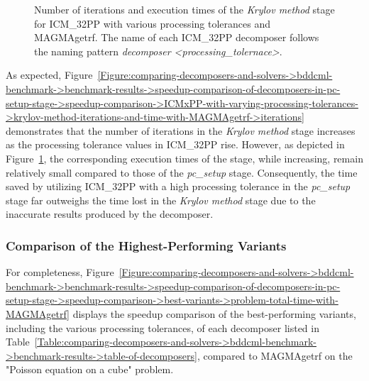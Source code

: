 \begin{figure}[ht!]
\begin{subfigure}{\textwidth}
		\label{Figure:comparing-decomposers-and-solvers->bddcml-benchmark->benchmark-results->speedup-comparison-of-decomposers-in-pc-setup-stage->speedup-comparison->ICMxPP-with-varying-processing-tolerances->krylov-method-iterations-and-time-with-MAGMAgetrf->time}
	\end{subfigure}
	\caption{Number of iterations and execution times of the \textit{Krylov method} stage for ICM\_32PP with various processing tolerances and MAGMAgetrf.
		The name of each ICM\_32PP decomposer follows the naming pattern \textit{decomposer <processing\_tolernace>}.
	}
	\label{Figure:comparing-decomposers-and-solvers->bddcml-benchmark->benchmark-results->speedup-comparison-of-decomposers-in-pc-setup-stage->speedup-comparison->ICMxPP-with-varying-processing-tolerances->krylov-method-iterations-and-time-with-MAGMAgetrf}
\end{figure}

As expected, Figure~\ref{Figure:comparing-decomposers-and-solvers->bddcml-benchmark->benchmark-results->speedup-comparison-of-decomposers-in-pc-setup-stage->speedup-comparison->ICMxPP-with-varying-processing-tolerances->krylov-method-iterations-and-time-with-MAGMAgetrf->iterations} demonstrates that the number of iterations in the \textit{Krylov method} stage increases as the processing tolerance values in ICM\_32PP rise.
However, as depicted in Figure~\ref{Figure:comparing-decomposers-and-solvers->bddcml-benchmark->benchmark-results->speedup-comparison-of-decomposers-in-pc-setup-stage->speedup-comparison->ICMxPP-with-varying-processing-tolerances->krylov-method-iterations-and-time-with-MAGMAgetrf->time}, the corresponding execution times of the stage, while increasing, remain relatively small compared to those of the \textit{pc\_setup} stage.
Consequently, the time saved by utilizing ICM\_32PP with a high processing tolerance in the \textit{pc\_setup} stage far outweighs the time lost in the \textit{Krylov method} stage due to the inaccurate results produced by the decomposer.

\subsubsection{Comparison of the Highest-Performing Variants} For completeness, Figure~\ref{Figure:comparing-decomposers-and-solvers->bddcml-benchmark->benchmark-results->speedup-comparison-of-decomposers-in-pc-setup-stage->speedup-comparison->best-variants->problem-total-time-with-MAGMAgetrf} displays the speedup comparison of the best-performing variants, including the various processing tolerances, of each decomposer listed in Table~\ref{Table:comparing-decomposers-and-solvers->bddcml-benchmark->benchmark-results->table-of-decomposers}, compared to MAGMAgetrf on the "Poisson equation on a cube" problem.

